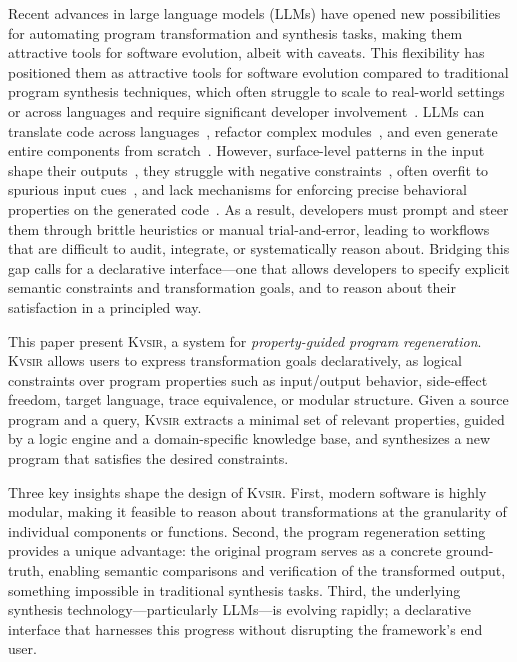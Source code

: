 \documentclass[sigplan,review,anonymous,10pt]{acmart}
\newcommand{\sys}{{\scshape Kv{\textalpha}sir}\xspace}
\begin{document}
Recent advances in large language models (LLMs) have opened new possibilities for automating program transformation and synthesis tasks, making them attractive tools for software evolution, albeit with caveats.
This flexibility has positioned them as attractive tools for software evolution
compared to traditional program synthesis techniques, which often struggle
to scale to real-world settings or across languages and require significant developer involvement~\cite{reynolds2019syguscomp,leino2016dafny,wu2023programming,dynamoth2016,cambronero2019active}.
LLMs can translate code across languages~\cite{ou2025enhancingllmbasedcodetranslation},
refactor complex modules~\cite{ziftci2025migrating},
and even generate entire components from scratch~\cite{huynh2025largelanguagemodelscode}.
However, surface-level patterns in the input shape their outputs~\cite{yang2025evaluatinggeneralizationcapabilitieslarge},
they struggle with negative constraints~\cite{hwang2024thinkpinkelephant,jiang2024llmsdreamelephantswhen},
often overfit to spurious input cues~\cite{xu2023llmfoolitselfpromptbased, wu2023deceptpromptexploitingllmdrivencode},
and lack mechanisms for enforcing precise behavioral properties on the generated code~\cite{roh2025breakthechainreasoningfailuresllms}.
As a result, developers must prompt and steer them through brittle heuristics or manual trial-and-error, leading to workflows that are difficult to audit, integrate, or systematically reason about.
Bridging this gap calls for a declarative interface---one that allows developers to specify explicit semantic constraints and transformation goals, and to reason about their satisfaction in a principled way.

This paper present \sys, a system for \emph{property-guided program regeneration}.
\sys allows users
to express transformation goals declaratively, as logical constraints over
program properties such as input/output behavior, side-effect freedom, target
language, trace equivalence, or modular structure.
Given a source program and
a query, \sys extracts a minimal set of relevant properties, guided by a
logic engine and a domain-specific knowledge base, and synthesizes a new
program that satisfies the desired constraints.

Three key insights shape the design of \sys.
First, modern software is highly modular, making it feasible to reason about transformations at the granularity of individual components or functions.
Second, the program regeneration setting provides a unique advantage: the original program serves as a concrete ground-truth, enabling semantic comparisons and verification of the transformed output, something impossible in traditional synthesis tasks.
Third, the underlying synthesis technology---particularly LLMs---is evolving rapidly; a declarative interface that harnesses this progress without disrupting the framework's end user.
\end{document}
